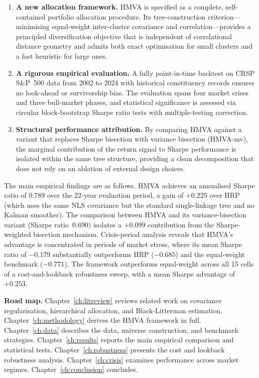\documentclass[a4paper,12pt]{report}
\begin{document}
\begin{enumerate}
  \item \textbf{A new allocation framework.} HMVA is specified as a complete,
        self-contained portfolio allocation procedure. Its tree-construction
        criterion---minimising equal-weight inter-cluster covariance and
        correlation---provides a principled diversification objective that is
        independent of correlational distance geometry and admits both exact
        optimisation for small clusters and a fast heuristic for large ones.
  \item \textbf{A rigorous empirical evaluation.} A fully point-in-time
        backtest on CRSP S\&P~500 data from 2002 to 2024 with historical
        constituency records ensures no look-ahead or survivorship bias.
        The evaluation spans four market crises and three bull-market phases,
        and statistical significance is assessed via circular block-bootstrap
        Sharpe ratio tests with multiple-testing correction.
  \item \textbf{Structural performance attribution.} By comparing HMVA against
        a variant that replaces Sharpe bisection with variance bisection
        (HMVA-mv), the marginal contribution of the return signal to Sharpe
        performance is isolated within the same tree structure,
        providing a clean decomposition that does not rely on an ablation
        of external design choices.
\end{enumerate}

The main empirical findings are as follows. HMVA achieves an annualised Sharpe
ratio of $0.789$ over the 22-year evaluation period, a gain of $+0.225$ over
HRP (which uses the same NLS covariance but the standard single-linkage tree
and no Kalman smoother). The comparison between HMVA and its variance-bisection
variant (Sharpe ratio~$0.690$) isolates a $+0.099$ contribution from the
Sharpe-weighted bisection mechanism. Crisis-period analysis reveals that HMVA's
advantage is concentrated in periods of market stress, where its mean Sharpe
ratio of $-0.179$ substantially outperforms HRP ($-0.685$) and the equal-weight
benchmark ($-0.771$). The framework outperforms equal-weight across all 15
cells of a cost-and-lookback robustness sweep, with a mean Sharpe advantage
of $+0.253$.

\textbf{Road map.} Chapter~\ref{ch:litreview} reviews related work on
covariance regularisation, hierarchical allocation, and Black-Litterman
estimation. Chapter~\ref{ch:methodology} derives the HMVA framework in full.
Chapter~\ref{ch:data} describes the data, universe construction, and
benchmark strategies. Chapter~\ref{ch:results} reports the main empirical
comparison and statistical tests. Chapter~\ref{ch:robustness} presents the
cost and lookback robustness analysis. Chapter~\ref{ch:crisis} examines
performance across market regimes. Chapter~\ref{ch:conclusion} concludes.
\end{document}
